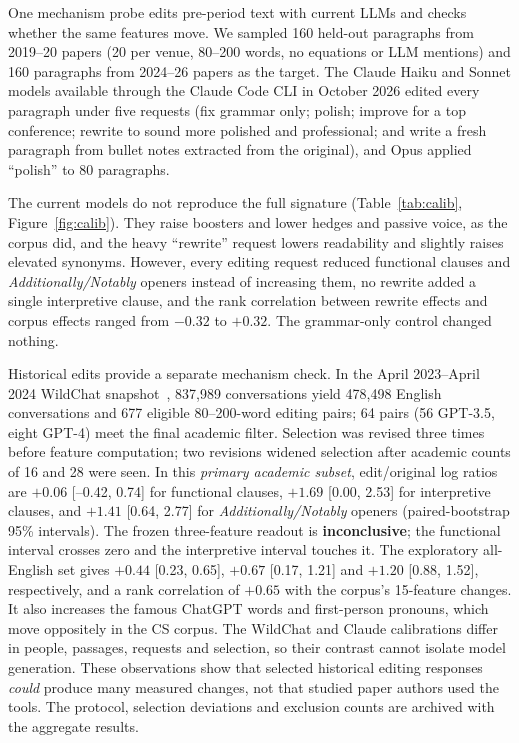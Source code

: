 \documentclass[10pt,twocolumn]{article}
\begin{document}
One mechanism probe edits pre-period text with current LLMs and checks whether the same features move. We sampled 160 held-out paragraphs from 2019--20 papers (20 per venue, 80--200 words, no equations or LLM mentions) and 160 paragraphs from 2024--26 papers as the target. The Claude Haiku and Sonnet models available through the Claude Code CLI in October 2026 edited every paragraph under five requests (fix grammar only; polish; improve for a top conference; rewrite to sound more polished and professional; and write a fresh paragraph from bullet notes extracted from the original), and Opus applied ``polish'' to 80 paragraphs.

\begin{table}[t]
\centering\small

\caption{Rewrite calibration: log ratio of each measure in the edited text against the original 2019--20 paragraphs (Flesch: difference divided by 10). ``Corpus'' is the real change between 2019--20 and 2024--26 paragraphs. S/H/O: Claude Sonnet, Haiku, Opus.}
\label{tab:calib}
\end{table}

The current models do not reproduce the full signature (Table~\ref{tab:calib}, Figure~\ref{fig:calib}). They raise boosters and lower hedges and passive voice, as the corpus did, and the heavy ``rewrite'' request lowers readability and slightly raises elevated synonyms. However, every editing request reduced functional clauses and \textit{Additionally/Notably} openers instead of increasing them, no rewrite added a single interpretive clause, and the rank correlation between rewrite effects and corpus effects ranged from $-0.32$ to $+0.32$. The grammar-only control changed nothing.

Historical edits provide a separate mechanism check. In the April 2023--April 2024 WildChat snapshot~\citep{zhao2024wildchat}, 837,989 conversations yield 478,498 English conversations and 677 eligible 80--200-word editing pairs; 64 pairs (56 GPT-3.5, eight GPT-4) meet the final academic filter. Selection was revised three times before feature computation; two revisions widened selection after academic counts of 16 and 28 were seen. In this \emph{primary academic subset}, edit/original log ratios are $+0.06$ [--0.42, 0.74] for functional clauses, $+1.69$ [0.00, 2.53] for interpretive clauses, and $+1.41$ [0.64, 2.77] for \textit{Additionally/Notably} openers (paired-bootstrap 95\% intervals). The frozen three-feature readout is \textbf{inconclusive}; the functional interval crosses zero and the interpretive interval touches it. The exploratory all-English set gives $+0.44$ [0.23, 0.65], $+0.67$ [0.17, 1.21] and $+1.20$ [0.88, 1.52], respectively, and a rank correlation of $+0.65$ with the corpus's 15-feature changes. It also increases the famous ChatGPT words and first-person pronouns, which move oppositely in the CS corpus. The WildChat and Claude calibrations differ in people, passages, requests and selection, so their contrast cannot isolate model generation. These observations show that selected historical editing responses \emph{could} produce many measured changes, not that studied paper authors used the tools. The protocol, selection deviations and exclusion counts are archived with the aggregate results.
\end{document}
